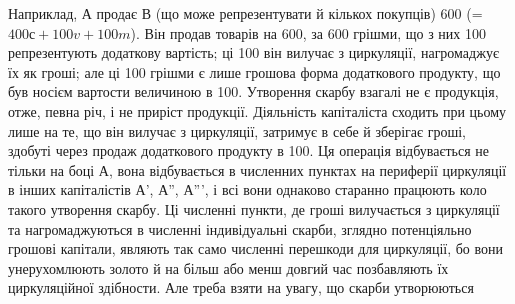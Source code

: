 Наприклад, А продає В (що може репрезентувати й кількох покупців)
600 (= $400 с + 100 v + 100 m$). Він продав товарів на 600, за
600 грішми, що з них 100 репрезентують додаткову вартість; ці
100 він вилучає з циркуляції, нагромаджує їх як гроші; але ці 100 грішми
є лише грошова форма додаткового продукту, що був носієм вартости
величиною в 100. Утворення скарбу взагалі не є продукція, отже, певна
річ, і не приріст продукції. Діяльність капіталіста сходить при цьому
лише на те, що він вилучає з циркуляції, затримує в себе й зберігає
гроші, здобуті через продаж додаткового продукту в 100. Ця операція
відбувається не тільки на боці А, вона відбувається в численних пунктах
на периферії циркуляції в інших капіталістів А', А'', А''', і всі вони однаково
старанно працюють коло такого утворення скарбу. Ці численні
пункти, де гроші вилучається з циркуляції та нагромаджуються в численні
індивідуальні скарби, зглядно потенціяльно грошові капітали, являють
так само численні перешкоди для циркуляції, бо вони унерухомлюють
золото й на більш або менш довгий час позбавляють їх циркуляційної
здібности. Але треба взяти на увагу, що скарби утворюються
\parbreak{}  %

